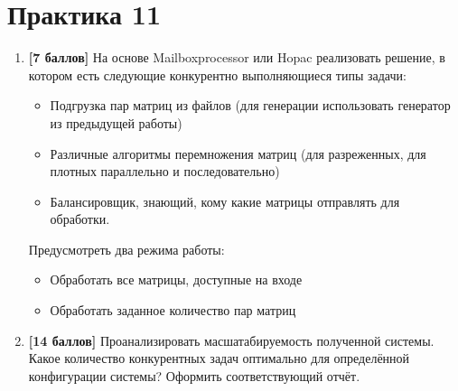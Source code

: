 \section{Практика 11}

\begin{enumerate}
    \item \textbf{[7 баллов]} На основе Mailboxprocessor или Hopac реализовать решение, в котором есть следующие конкурентно выполняющиеся типы задачи: 
    \begin{itemize}
        \item Подгрузка пар матриц из файлов (для генерации использовать генератор из предыдущей работы)
        \item Различные алгоритмы перемножения матриц (для разреженных, для плотных параллельно и последовательно)
        \item Балансировщик, знающий, кому какие матрицы отправлять для обработки.
    \end{itemize}
    Предусмотреть два режима работы: 
    \begin{itemize}
        \item Обработать все матрицы, доступные на входе
        \item Обработать заданное количество пар матриц
    \end{itemize}
    \item \textbf{[14 баллов]} Проанализировать масшатабируемость полученной системы. Какое количество конкурентных задач оптимально для определённой конфигурации системы? Оформить соответствующий отчёт.
\end{enumerate}

